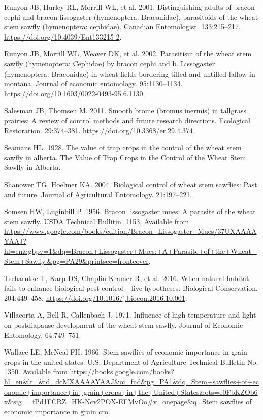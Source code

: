 \documentclass[
]{article}
\newlength{\cslhangindent}
\newenvironment{CSLReferences}[2] %
 {\begin{list}{}{%
  \setlength{\itemindent}{0pt}
  \setlength{\leftmargin}{0pt}
  \setlength{\parsep}{0pt}
  \ifodd #1
   \setlength{\leftmargin}{\cslhangindent}
   \setlength{\itemindent}{-1\cslhangindent}
  \fi
  \setlength{\itemsep}{#2\baselineskip}}}
 {\end{list}}
\begin{document}
\begin{CSLReferences}{0}{1}
Runyon JB, Hurley RL, Morrill WL, et al. 2001. Distinguishing adults of
bracon cephi and bracon lissogaster (hymenoptera: Braconidae),
parasitoids of the wheat stem sawfly (hymenoptera: cephidae). Canadian
Entomologist. 133:215--217. \url{https://doi.org/10.4039/Ent133215-2}.

Runyon JB, Morrill WL, Weaver DK, et al. 2002. Parasitism of the wheat
stem sawfly (hymenoptera: Cephidae) by bracon cephi and b. Lissogaster
(hymenoptera: Braconidae) in wheat fields bordering tilled and untilled
fallow in montana. Journal of economic entomology. 95:1130--1134.
\url{https://doi.org/10.1603/0022-0493-95.6.1130}.

Salesman JB, Thomsen M. 2011. Smooth brome (bromus inermis) in tallgrass
prairies: A review of control methods and future research directions.
Ecological Restoration. 29:374--381.
\url{https://doi.org/10.3368/er.29.4.374}.

Seamans HL. 1928. The value of trap crops in the control of the wheat
stem sawfly in alberta. The Value of Trap Crops in the Control of the
Wheat Stem Sawfly in Alberta.

Shanower TG, Hoelmer KA. 2004. Biological control of wheat stem
sawflies: Past and future. Journal of Agricultural Entomology.
21:197--221.

Somsen HW, Luginbill P. 1956. Bracon lissogaster mues: A parasite of the
wheat stem sawfly. USDA Technical Bullitin. 1153. Available from
\url{https://www.google.com/books/edition/Bracon_Lissogaster_Mues/37UXAAAAYAAJ?hl=en&gbpv=1&dq=Bracon+Lissogaster+Mues:+A+Parasite+of+the+Wheat+Stem+Sawfly.&pg=PA29&printsec=frontcover}.

Tscharntke T, Karp DS, Chaplin-Kramer R, et al. 2016. When natural
habitat fails to enhance biological pest control -- five hypotheses.
Biological Conservation. 204:449--458.
\url{https://doi.org/10.1016/j.biocon.2016.10.001}.

Villacorta A, Bell R, Callenbach J. 1971. Influence of high temperature
and light on postdiapause development of the wheat stem sawfly. Journal
of Economic Entomology. 64:749--751.

Wallace LE, McNeal FH. 1966. Stem sawflies of economic importance in
grain crops in the united states. U.S. Department of Agriculture
Technical Bulletin No. 1350. Available from
\href{https://books.google.com/books?hl=en&lr=&id=dcMXAAAAYAAJ&oi=fnd&pg=PA1&dq=Stem+sawflies+of+economic+importance+in+grain+crops+in+the+United+States&ots=e0FbKZOb6x&sig=_fPd1FCRZ_HK-Ncv2POX-EFMvOo\#v=onepage&q=Stem\%20sawflies\%20of\%20economic\%20importance\%20in\%20grain\%20cro}{https://books.google.com/books?hl=en\&lr=\&id=dcMXAAAAYAAJ\&oi=fnd\&pg=PA1\&dq=Stem+sawflies+of+economic+importance+in+grain+crops+in+the+United+States\&ots=e0FbKZOb6x\&sig=\_fPd1FCRZ\_HK-Ncv2POX-EFMvOo\#v=onepage\&q=Stem
sawflies of economic importance in grain cro}.


\end{CSLReferences}
\end{document}
